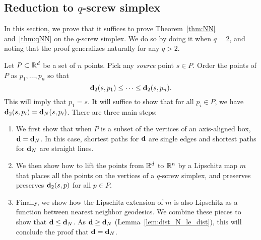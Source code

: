 \subsection{Reduction to $q$-screw simplex} %
\label{sec:reduction-to-screw}
In this section, we prove that it suffices to prove Theorem~\ref{thm:NN}
and~\ref{thm:qNN} on the $q$-screw simplex. We do so by doing it when
$q=2$, and noting that the proof generalizes naturally for any $q > 2$.

  Let $P\subset \mathbb{R}^d$ be a set of $n$ points.
  Pick any \emph{source} point $s\in P$.
  Order the points of $P$ as $p_1,\ldots ,p_n$ so that
  \[
    \mathbf{d}_2(s,p_1) \le \cdots \le \mathbf{d}_2(s, p_n).
  \]
  This will imply that $p_1 = s$.
  It will suffice to show that for all $p_i\in P$, we have $\mathbf{d}_2(s,p_i) = \mathbf{d}_N(s,p_i)$.
  There are three main steps:
  \begin{enumerate}
    \item We first show that when $P$ is a subset of the vertices of an axis-aligned box, $\mathbf{d} = \mathbf{d}_N$.  In this case, shortest paths for $\mathbf{d}$ are single edges and shortest paths for $\mathbf{d}_N$ are straight lines.
		\item We then show how to lift the points from $\mathbb{R}^d$ to $\mathbb{R}^n$ by a
Lipschitz map $m$ that places all the points on the vertices of a $q$-screw
simplex, and preserves preserves $\mathbf{d}_2(s,p)$ for all $p\in P$.
		\item Finally, we show how the Lipschitz extension of $m$ is also
Lipschitz as a function between nearest neighbor geodesics.  We combine
these pieces to show that $\mathbf{d} \le \mathbf{d}_N$.  As $\mathbf{d} \ge \mathbf{d}_N$
(Lemma~\ref{lem:dist_N_le_dist}), this will conclude the proof that $\mathbf{d}
= \mathbf{d}_N$.
  \end{enumerate}
  
  
  
  
  
